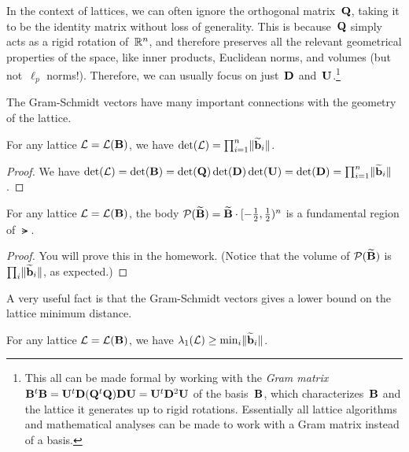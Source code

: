 \documentclass[11pt]{article}
\begin{document}
In the context of lattices, we can often ignore the orthogonal
matrix~$\mathbf{Q}$, taking it to be the identity matrix without loss of
generality. This is because~$\mathbf{Q}$ simply acts as a rigid rotation
of~$\mathbb{R}^{n}$, and therefore preserves all the relevant geometrical
properties of the space, like inner products, Euclidean norms, and
volumes (but not~$\ell_{p}$ norms!). Therefore, we can usually focus
on just~$\mathbf{D}$ and~$\mathbf{U}$.\footnote{This all can be made formal by
  working with the \emph{Gram matrix}
  $\mathbf{B}^{t} \mathbf{B} = \mathbf{U}^{t} \mathbf{D} (\mathbf{Q}^{t} \mathbf{Q}) \mathbf{D} \mathbf{U} =
  \mathbf{U}^{t} \mathbf{D}^{2} \mathbf{U}$ of the basis~$\mathbf{B}$, which
  characterizes~$\mathbf{B}$ and the lattice it generates up to rigid
  rotations. Essentially all lattice algorithms and mathematical
  analyses can be made to work with a Gram matrix instead of a basis.}

\medskip

\noindent The Gram-Schmidt vectors have many important connections
with the geometry of the lattice.

\begin{lemma}
  \label{lem:gs-det}
  For any lattice $\mathcal{L} = \mathcal{L}(\mathbf{B})$, we have
  $\det(\mathcal{L}) = \prod_{i=1}^{n} \lVert\widetilde{\mathbf{b}}_{i}\rVert$.
\end{lemma}

\begin{proof}
  We have
  $\det(\mathcal{L}) = \det(\mathbf{B}) = \det(\mathbf{Q}) \det(\mathbf{D}) \det(\mathbf{U}) =
  \det(\mathbf{D}) = \prod_{i=1}^{n} \lVert\widetilde{\mathbf{b}}_{i}\rVert$.
\end{proof}

\begin{lemma}
  \label{lem:gs-fund-region}
  For any lattice $\mathcal{L} = \mathcal{L}(\mathbf{B})$, the body
  $\mathcal{P}(\widetilde{\mathbf{B}}) = \widetilde{\mathbf{B}} \cdot [-\tfrac12,\tfrac12)^{n}$ is a fundamental
  region of $\lat$.
\end{lemma}

\begin{proof}
  You will prove this in the homework. (Notice that the volume of
  $\mathcal{P}(\widetilde{\mathbf{B}})$ is $\prod_{i} \lVert\widetilde{\mathbf{b}}_{i}\rVert$, as
  expected.)
\end{proof}

\noindent A very useful fact is that the Gram-Schmidt vectors gives a
lower bound on the lattice minimum distance.

\begin{lemma}
  \label{lem:gs-lower-lambda}
  For any lattice $\mathcal{L} = \mathcal{L}(\mathbf{B})$, we have
  $\lambda_1(\mathcal{L}) \geq \min_i \lVert\widetilde{\mathbf{b}}_i\rVert$.
\end{lemma}
\end{document}
